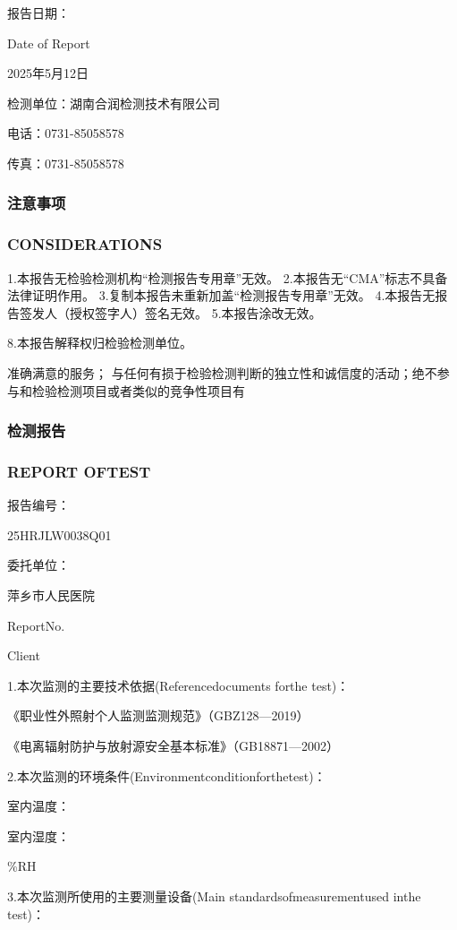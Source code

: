 报告日期：

Date of Report

2025年5月12日

检测单位：湖南合润检测技术有限公司

电话：0731-85058578

传真：0731-85058578

\subsubsection{注意事项}

\subsubsection{CONSIDERATIONS}

1.本报告无检验检测机构“检测报告专用章”无效。
2.本报告无“CMA”标志不具备法律证明作用。
3.复制本报告未重新加盖“检测报告专用章”无效。
4.本报告无报告签发人（授权签字人）签名无效。
5.本报告涂改无效。


8.本报告解释权归检验检测单位。

准确满意的服务；
与任何有损于检验检测判断的独立性和诚信度的活动；绝不参与和检验检测项目或者类似的竞争性项目有

\subsubsection{检测报告}

\subsubsection{REPORT OFTEST}

报告编号：

25HRJLW0038Q01

委托单位：

萍乡市人民医院

ReportNo.

Client

1.本次监测的主要技术依据(Referencedocuments forthe test)：

《职业性外照射个人监测监测规范》（GBZ128—2019）

《电离辐射防护与放射源安全基本标准》（GB18871—2002）

2.本次监测的环境条件(Environmentconditionforthetest)：

室内温度：

室内湿度：

\%RH

3.本次监测所使用的主要测量设备(Main standardsofmeasurementused inthe test)：

